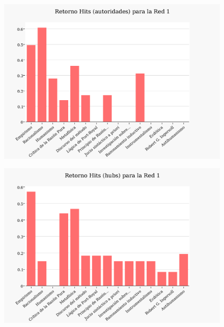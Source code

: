 \documentclass[a4paper]{article}
\begin{document}
\newpage
\begin{figure}[h!]
  \begin{center}
	\includegraphics[scale=0.66]{imagenes/Exp1/hitsA1}
	\caption{}	
	\label{hitsa1}
  \end{center}
\end{figure}

\begin{figure}[h!]
  \begin{center}
	\includegraphics[scale=0.66]{imagenes/Exp1/hitsH1}
	\caption{}
	\label{hitsh1}
  \end{center}
\end{figure}

\newpage
\end{document}
